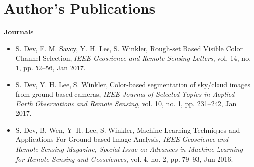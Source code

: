 \chapter*{\centering Author's Publications}


\textbf{Journals}
\begin{itemize}[leftmargin=*]
\item S. Dev, F. M. Savoy, Y. H. Lee, S. Winkler, Rough-set Based Visible Color Channel Selection, \emph{IEEE Geoscience and Remote Sensing Letters}, vol. 14, no. 1, pp. 52--56, Jan 2017. 
\item S. Dev, Y. H. Lee, S. Winkler, Color-based segmentation of sky/cloud images from ground-based cameras, \emph{IEEE Journal of Selected Topics in Applied Earth Observations and Remote Sensing}, vol. 10, no. 1, pp. 231--242, Jan 2017. 
\item S. Dev, B. Wen, Y. H. Lee, S. Winkler, Machine Learning Techniques and Applications For Ground-based Image Analysis, \emph{IEEE Geoscience and Remote Sensing Magazine, Special Issue on Advances in Machine Learning for Remote Sensing and Geosciences}, vol. 4, no. 2, pp. 79--93, Jun 2016. 
\end{itemize}

